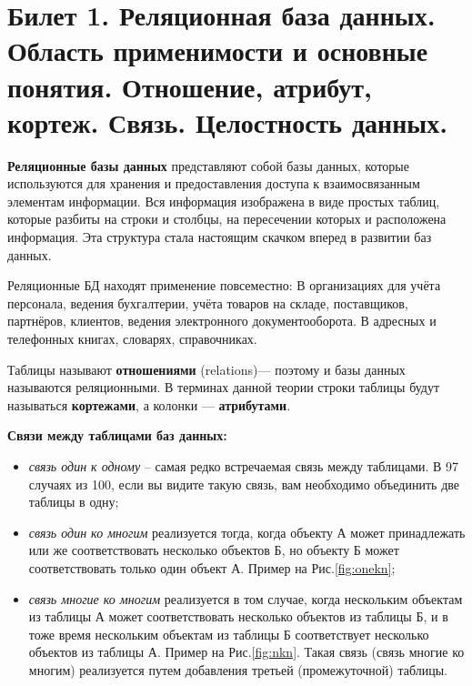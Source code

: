 \newpage
\section{Билет 1. Реляционная база данных. Область применимости и основные понятия. Отношение, атрибут, кортеж. Связь. Целостность данных.}

\textbf{Реляционные базы данных} представляют собой базы данных, которые используются для хранения и предоставления доступа к взаимосвязанным элементам информации. Вся информация изображена в виде простых таблиц, которые разбиты на строки и столбцы, на пересечении которых и расположена информация. Эта структура стала настоящим скачком вперед в развитии баз данных.

Реляционные БД находят применение повсеместно: В организациях для учёта персонала, ведения бухгалтерии, учёта товаров на складе, поставщиков, партнёров, клиентов, ведения электронного документооборота. В адресных и телефонных книгах, словарях, справочниках.

Таблицы называют \textbf{отношениями} (relations)— поэтому и базы данных называются реляционными. В терминах данной теории строки таблицы будут называться \textbf{кортежами}, а колонки — \textbf{атрибутами}.

\textbf{Связи между таблицами баз данных:}
\begin{itemize}
    \item \textit{связь один к одному} – самая редко встречаемая связь между таблицами. В 97 случаях из 100, если вы видите такую связь, вам необходимо объединить две таблицы в одну;
    \item \textit{связь один ко многим} реализуется тогда, когда объекту А может принадлежать или же соответствовать несколько объектов Б, но объекту Б может соответствовать только один объект А. Пример на Рис.\ref{fig:onekn};
    \item \textit{связь многие ко многим} реализуется в том случае, когда нескольким объектам из таблицы А может соответствовать несколько объектов из таблицы Б, и в тоже время нескольким объектам из таблицы Б соответствует несколько объектов из таблицы А. Пример на Рис.\ref{fig:nkn}. Такая связь (связь многие ко многим) реализуется путем добавления третьей (промежуточной) таблицы.
\end{itemize}

